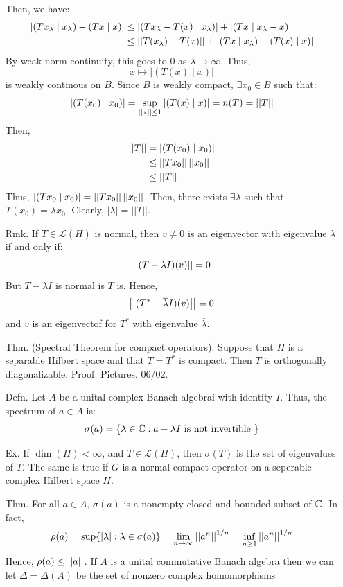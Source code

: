 \documentclass[12pt]{article}
\begin{document}
\begin{itemize}
    Then, we have:
    \begin{align*}
        |(Tx_\lambda \mid x_\lambda) -(Tx \mid x)| &\leq |(Tx_\lambda - T(x) \mid x_\lambda)| + |(Tx \mid x_\lambda - x)| \\
        &\leq \norm{T(x_\lambda)-T(x)} + |(Tx \mid x_\lambda)-(T(x)\mid x)|
    \end{align*}
    By weak-norm continuity, this goes to $0$ as $\lambda \to \infty$. Thus, 
    \[ x \mapsto |(T(x) \mid x)|\]
    is weakly continous on $B$. Since $B$ is weakly compact, $\exists x_0 \in B$ such that:
    \[ |(T(x_0) \mid x_0)| = \sup_{\norm{x} \leq 1} |(T(x) \mid x)| = n(T) = ||T||\]
    Then, 
    \begin{align*}
        \norm{T} &= |(T(x_0) \mid x_0)| \\
        &\leq \norm{Tx_0}\norm{x_0} \\
        &\leq \norm{T}
    \end{align*} 
    Thus, $|(Tx_0 \mid x_0)| = \norm{Tx_0}\norm{x_0}$. Then, there exists $\exists \lambda$ such that $T(x_0) = \lambda x_0$. Clearly, $|\lambda| = ||T||$.
    \item[Rmk.] If $T \in \mathcal{L}(H)$ is normal, then $v \neq 0$ is an eigenvector with eigenvalue $\lambda$ if and only if:
    \[\left\vert\left\vert(T-\lambda I)(v)\right\vert\right\vert = 0\]
    But $T-\lambda I$ is normal is $T$ is. Hence, 
    \[\left\vert\left\vert(T^*-\overline{\lambda}I)(v)\right\vert\right\vert = 0 \]
    and $v$ is an eigenvectof for $T^*$ with eigenvalue $\overline{\lambda}$.
    \item[Thm.] (Spectral Theorem for compact operators). Suppose that $H$ is a separable Hilbert space and that $T = T^*$ is compact. Then $T$ is orthogonally diagonalizable. \bbni
    Proof. Pictures. 06/02.
    \newpage
    \item[Defn.] Let $A$ be a unital complex Banach algebrai with identity $I$. Thus, the spectrum of $a \in A$ is: 
    \[ \sigma(a) = \{\lambda \in \mathbb C : a - \lambda I \text{ is not invertible }\}\]
    \item[Ex.] If $\dim(H) < \infty$, and $T \in \mathcal{L}(H)$, then $\sigma(T)$ is the set of eigenvalues of $T$. The same is true if $G$ is a normal compact operator on a seperable complex Hilbert space $H$. 
    \item[Thm.] For all $ a\in A$, $\sigma(a)$ is a nonempty closed and bounded subset of $\mathbb C$. In fact, 
    \[ \rho(a) = \sup\{|\lambda| : \lambda \in \sigma(a)\} = \lim_{n\to\infty} \left\vert\left\vert a^n\right\vert\right\vert^{1/n} = \inf_{n\geq 1} \left\vert\left\vert a^n\right\vert\right\vert^{1/n}\]
    Hence, $\rho(a) \leq \left\vert\left\vert a\right\vert\right\vert$.
    If $A$ is a unital commutative Banach algebra then we can let $\Delta = \Delta(A)$ be the set of nonzero complex homomorphisms

\end{itemize}
\end{document}
